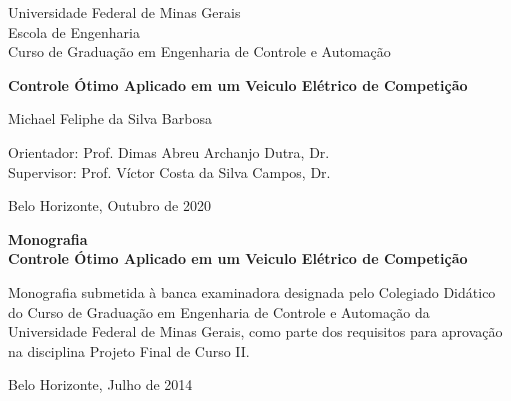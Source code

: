 \begin{titlepage}
	\begin{center}
		{\large Universidade Federal de Minas Gerais\\
			Escola de Engenharia \\
			Curso de Graduação em Engenharia de Controle e Automação\\}

		\vspace{6cm}
		{\bf\Large Controle Ótimo Aplicado em\vspace{0.2cm}
			um Veiculo Elétrico de Competição}
		\vspace{4cm}

		{\large Michael Feliphe da Silva Barbosa}
		\vspace{2cm}

		\vspace{2cm}
		{\large Orientador: Prof. Dimas Abreu Archanjo Dutra, Dr.}\\
		{\large Supervisor: Prof. Víctor Costa da Silva Campos, Dr.}

		\vfill
		{\large Belo Horizonte, Outubro de 2020}
	\end{center}

\end{titlepage}

\newpage
\clearpage
\thispagestyle{empty}


\begin{titlepage}

	\centering
	\textbf{Monografia}\\
	\vspace{2cm}
	\centering
	\textbf{Controle Ótimo Aplicado em um Veiculo Elétrico de Competição}\\
	\vspace{5cm}

	\parbox{1.0\textwidth}
	{\large
		Monografia submetida à banca examinadora
		designada pelo Colegiado Didático do Curso de
		Graduação em Engenharia de Controle e
		Automação da Universidade Federal de Minas
		Gerais, como parte dos requisitos para aprovação na
		disciplina Projeto Final de Curso II.}

	\vspace{7cm}
	\centering
	Belo Horizonte, Julho de 2014

\end{titlepage}
